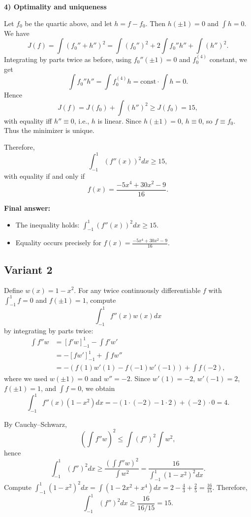 \documentclass[12pt,a4paper]{article}
\theoremstyle{definition}
\begin{document}
    \textbf{4) Optimality and uniqueness}

    Let $f_0$ be the quartic above, and let $h = f - f_0$. Then $h(\pm 1) = 0$ and $\int h = 0$. We have
    $$J(f) = \int (f_0'' + h'')^2 = \int (f_0'')^2 + 2 \int f_0'' h'' + \int (h'')^2.$$
    Integrating by parts twice as before, using $f_0''(\pm 1)=0$ and $f_0^{(4)}$ constant, we get
    $$\int f_0'' h'' = \int f_0^{(4)} h = \text{const} \cdot \int h = 0.$$
    Hence
    $$J(f) = J(f_0) + \int (h'')^2 \geq J(f_0) = 15,$$
    with equality iff $h'' \equiv 0$, i.e., $h$ is linear. Since $h(\pm 1) = 0$, $h \equiv 0$, so $f \equiv f_0$. Thus the minimizer is unique.

    Therefore,
    $$\int_{-1}^{1} (f''(x))^2 dx \geq 15,$$
    with equality if and only if
    $$f(x) = \frac{-5 x^4 + 30 x^2 - 9}{16}.$$

    \textbf{Final answer:}
    \begin{itemize}
        \item The inequality holds: $\int_{-1}^{1} (f''(x))^2 dx \geq 15$.
        \item Equality occurs precisely for $f(x) = \frac{-5 x^4 + 30 x^2 - 9}{16}$.
    \end{itemize}
    \subsection{Variant 2}
    Define $w(x) = 1 - x^2$. For any twice continuously differentiable $f$ with $\int_{-1}^1 f = 0$ and $f(\pm 1) = 1$, compute
    $$\int_{-1}^1 f''(x) w(x) dx$$
    by integrating by parts twice:
    \begin{align}
        \int f'' w &= [f' w]_{-1}^1 - \int f' w'\\
        &= -[f w']_{-1}^1 + \int f w''\\
        &= -(f(1)w'(1) - f(-1)w'(-1)) + \int f (-2),
    \end{align}
    where we used $w(\pm 1) = 0$ and $w'' = -2$. Since $w'(1) = -2$, $w'(-1) = 2$, $f(\pm 1) = 1$, and $\int f = 0$, we obtain
    $$\int_{-1}^1 f''(x) (1 - x^2) dx = -(1 \cdot (-2) - 1 \cdot 2) + (-2) \cdot 0 = 4.$$

    By Cauchy--Schwarz,
    $$\left(\int f'' w\right)^2 \leq \int (f'')^2 \int w^2,$$
    hence
    $$\int_{-1}^1 (f'')^2 dx \geq \frac{(\int f'' w)^2}{\int w^2} = \frac{16}{\int_{-1}^1 (1 - x^2)^2 dx}.$$
    Compute $\int_{-1}^1 (1 - x^2)^2 dx = \int (1 - 2x^2 + x^4) dx = 2 - \frac{4}{3} + \frac{2}{5} = \frac{16}{15}$.
    Therefore,
    $$\int_{-1}^1 (f'')^2 dx \geq \frac{16}{16/15} = 15.$$
\end{document}
